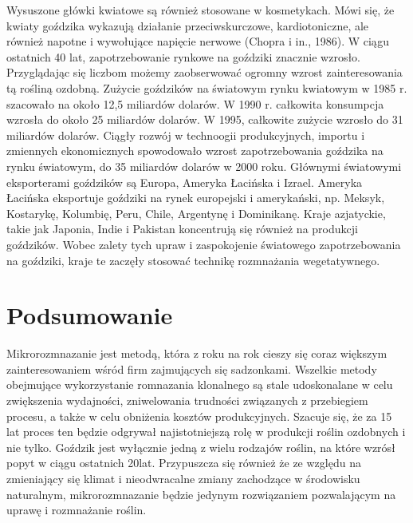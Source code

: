 \documentclass[two column, twoside, a4paper]{article}
\begin{document}
Wysuszone główki kwiatowe są również stosowane w kosmetykach. Mówi się, że kwiaty goździka wykazują działanie przeciwskurczowe, kardiotoniczne, ale również napotne i wywołujące napięcie nerwowe (Chopra i in., 1986).
W ciągu ostatnich 40 lat, zapotrzebowanie rynkowe na goździki znacznie wzrosło. Przyglądając się liczbom możemy zaobserwować ogromny wzrost zainteresowania tą rośliną ozdobną. Zużycie goździków na światowym rynku kwiatowym w 1985 r. szacowało na  około 12,5 miliardów dolarów. W 1990 r. całkowita konsumpcja wzrosła do około 25 miliardów dolarów. W 1995, całkowite zużycie wzrosło do 31 miliardów dolarów. Ciągły rozwój w technoogii produkcyjnych, importu i zmiennych ekonomicznych spowodowało wzrost zapotrzebowania goździka na rynku światowym, do 35 miliardów dolarów w 2000 roku.
Głównymi światowymi eksporterami goździków są Europa, Ameryka Łacińska i Izrael.
Ameryka Łacińska eksportuje goździki na rynek europejski i amerykański, np. Meksyk, Kostarykę, Kolumbię, Peru, Chile, Argentynę i Dominikanę. Kraje azjatyckie, takie jak Japonia, Indie i Pakistan koncentrują się również na produkcji goździków. Wobec
zalety tych upraw i zaspokojenie światowego zapotrzebowania na goździki, kraje te zaczęły stosować technikę rozmnażania wegetatywnego.

\section{Podsumowanie}

Mikrorozmnazanie jest metodą, która z roku na rok cieszy się coraz większym zainteresowaniem wśród firm zajmujących się sadzonkami. Wszelkie metody obejmujące wykorzystanie romnazania klonalnego są stale udoskonalane w celu zwiększenia wydajności, zniwelowania trudności związanych z przebiegiem procesu, a także w celu obniżenia kosztów produkcyjnych. Szacuje się, że za 15 lat proces ten będzie odgrywał najistotniejszą rolę w produkcji roślin ozdobnych i nie tylko. Goździk jest wyłącznie jedną z wielu rodzajów roślin, na które wzrósł popyt w ciągu ostatnich 20lat. Przypuszcza się również że ze względu na zmieniający się klimat i nieodwracalne zmiany zachodzące w środowisku naturalnym, mikrorozmnazanie będzie jedynym rozwiązaniem pozwalającym na uprawę i rozmnażanie roślin.

\nocite{Malepszy2004, Mulcahy1975, Jain1997, Gutierrez2010, Fraga2004, Forkmann1980, Casas2009, Ahmadian2017}
\printbibliography
\end{document}

